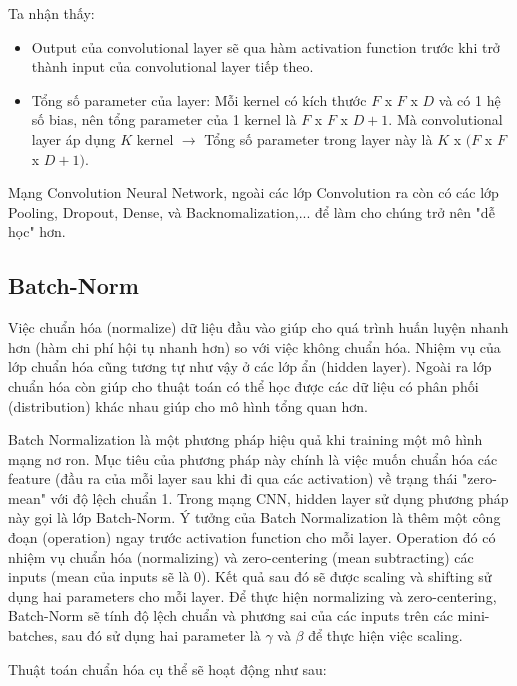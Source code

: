 Ta nhận thấy:
\begin{itemize}
\item Output của convolutional layer sẽ qua hàm activation function trước khi trở thành input của convolutional layer tiếp theo.
\item Tổng số parameter của layer: Mỗi kernel có kích thước $F$ x $F$ x $D$ và có 1 hệ số bias, nên tổng parameter của 1 kernel là $F$ x $F$ x $D + 1$. Mà convolutional layer áp dụng $K$ kernel $\rightarrow$ Tổng số parameter trong layer này là $K$ x $(F$ x $F$ x $D + 1)$.
\end{itemize}
Mạng Convolution Neural Network, ngoài các lớp Convolution ra còn có các lớp Pooling, Dropout, Dense, và Backnomalization,... để làm cho chúng trở nên "dễ học" hơn.

\subsection{Batch-Norm}
Việc chuẩn hóa (normalize) dữ liệu đầu vào giúp cho quá trình huấn luyện nhanh hơn (hàm chi phí hội tụ nhanh hơn) so với việc không chuẩn hóa. Nhiệm vụ của lớp chuẩn hóa cũng tương tự như vậy ở các lớp ẩn (hidden layer). Ngoài ra lớp chuẩn hóa còn giúp cho thuật toán có thể học được các dữ liệu có phân phối (distribution) khác nhau giúp cho mô hình tổng quan hơn.

Batch Normalization là một phương pháp hiệu quả khi training một mô hình mạng nơ ron. Mục tiêu của phương pháp này chính là việc muốn chuẩn hóa các feature (đầu ra của mỗi layer sau khi đi qua các activation) về trạng thái "zero-mean" với độ lệch chuẩn 1. Trong mạng CNN, hidden layer sử dụng phương pháp này gọi là lớp Batch-Norm. Ý tưởng của Batch Normalization là thêm một công đoạn (operation) ngay trước activation function cho mỗi layer. Operation đó có nhiệm vụ chuẩn hóa (normalizing) và zero-centering (mean subtracting) các inputs (mean của inputs sẽ là 0). Kết quả sau đó sẽ được scaling và shifting sử dụng hai parameters cho mỗi layer. Để thực hiện normalizing và zero-centering, Batch-Norm sẽ tính độ lệch chuẩn và phương sai của các inputs trên các mini-batches, sau đó sử dụng hai parameter là $\gamma$ và $ \beta$  để thực hiện việc scaling.

Thuật toán chuẩn hóa cụ thể sẽ hoạt động như sau:

